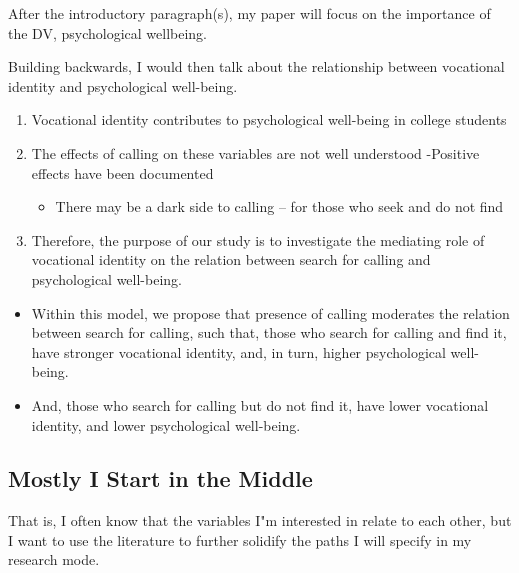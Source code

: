 \documentclass[
  english,
]{book}
\providecommand{\tightlist}{%
  \setlength{\itemsep}{0pt}\setlength{\parskip}{0pt}}
\begin{document}
After the introductory paragraph(s), my paper will focus on the importance of the DV, psychological wellbeing.

Building backwards, I would then talk about the relationship between vocational identity and psychological well-being.

\begin{enumerate}
\def\labelenumi{\arabic{enumi}.}
\tightlist
\item
  Vocational identity contributes to psychological well-being in college students
\item
  The effects of calling on these variables are not well understood
  -Positive effects have been documented

  \begin{itemize}
  \tightlist
  \item
    There may be a dark side to calling -- for those who seek and do not find
  \end{itemize}
\item
  Therefore, the purpose of our study is to investigate the mediating role of vocational identity on the relation between search for calling and psychological well-being.
\end{enumerate}

\begin{itemize}
\tightlist
\item
  Within this model, we propose that presence of calling moderates the relation between search for calling, such that, those who search for calling and find it, have stronger vocational identity, and, in turn, higher psychological well-being.
\item
  And, those who search for calling but do not find it, have lower vocational identity, and lower psychological well-being.
\end{itemize}

\hypertarget{mostly-i-start-in-the-middle}{%
\subsection{Mostly I Start in the Middle}\label{mostly-i-start-in-the-middle}}

That is, I often know that the variables I"m interested in relate to each other, but I want to use the literature to further solidify the paths I will specify in my research mode.
\end{document}
